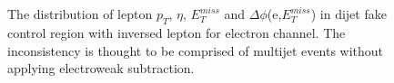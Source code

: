 \begin{figure}[ht]
       \centering
       \\ 
       \\
       \caption{The distribution of lepton $p_{T}$, $\eta$, $E_{T}^{miss}$ and $\Delta\phi$(e,$E_{T}^{miss}$) in dijet fake control region with inversed lepton for electron channel. The inconsistency is thought to be comprised of multijet events without applying electroweak subtraction.} 
       \label{fig:dijetFakeCR_el}
\end{figure}

